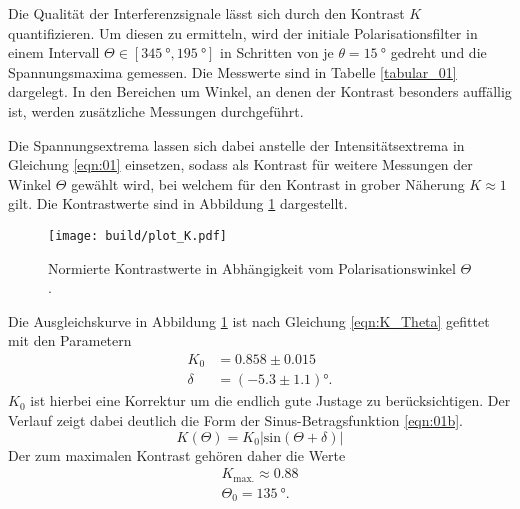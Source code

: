 \noindent Die Qualität der Interferenzsignale lässt sich durch den Kontrast $K$
quantifizieren. Um diesen zu ermitteln, wird der initiale Polarisationsfilter
in einem Intervall $\Theta \in [\SI{345}{\degree}, \SI{195}{\degree}]$
in Schritten von je $\theta = \SI{15}{\degree}$ gedreht und die Spannungsmaxima
gemessen. Die Messwerte sind in Tabelle \ref{tabular_01} dargelegt. In den
Bereichen um Winkel, an denen der Kontrast besonders auffällig ist, werden
zusätzliche Messungen durchgeführt. \\
\FloatBarrier

\FloatBarrier
\noindent Die Spannungsextrema lassen sich dabei anstelle der Intensitätsextrema
in Gleichung \ref{eqn:01} einsetzen, sodass als Kontrast für weitere Messungen
der Winkel $\Theta$ gewählt wird, bei welchem für den Kontrast in grober Näherung
$K \approx 1$ gilt. Die Kontrastwerte sind in Abbildung \ref{fig:02} dargestellt.
\FloatBarrier
\begin{figure}
  \centering
  \texttt{[image: build/plot\_K.pdf]}
  \caption{Normierte Kontrastwerte in Abhängigkeit vom Polarisationswinkel $\Theta$.}
  \label{fig:02}
\end{figure}
\FloatBarrier
\noindent Die Ausgleichskurve in Abbildung \ref{fig:02} ist nach Gleichung \ref{eqn:K_Theta} gefittet mit den Parametern
\begin{align}
  K_0    &= 0.858 \pm 0.015\\
  \delta &= (-5.3 \pm 1.1)°.
\end{align}
$K_0$ ist hierbei eine Korrektur um die endlich gute Justage zu berücksichtigen.
Der Verlauf zeigt dabei deutlich die Form der Sinus-Betragsfunktion \ref{eqn:01b}. \\
\begin{equation}
  K(\Theta) = K_0 \left| \text{sin}(\Theta + \delta) \right| \label{eqn:K_Theta}
\end{equation}
\noindent Der zum maximalen Kontrast gehören daher die Werte
\begin{align*}
  K_\text{max.} \approx \num{0.88} \\
  \Theta_0 = \SI{135}{\degree}.
\end{align*}

